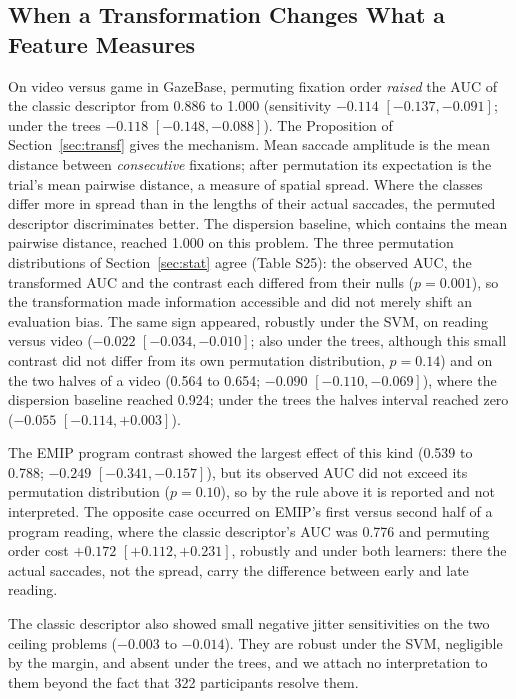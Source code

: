 \subsection{When a Transformation Changes What a Feature Measures}\label{sec:against}
On video versus game in GazeBase, permuting fixation order \emph{raised} the AUC of the classic descriptor from 0.886 to 1.000 (sensitivity $-0.114$ $[-0.137, -0.091]$; under the trees $-0.118$ $[-0.148, -0.088]$). The Proposition of Section~\ref{sec:transf} gives the mechanism. Mean saccade amplitude is the mean distance between \emph{consecutive} fixations; after permutation its expectation is the trial's mean pairwise distance, a measure of spatial spread. Where the classes differ more in spread than in the lengths of their actual saccades, the permuted descriptor discriminates better. The dispersion baseline, which contains the mean pairwise distance, reached 1.000 on this problem. The three permutation distributions of Section~\ref{sec:stat} agree (Table S25): the observed AUC, the transformed AUC and the contrast each differed from their nulls ($p = 0.001$), so the transformation made information accessible and did not merely shift an evaluation bias. The same sign appeared, robustly under the SVM, on reading versus video ($-0.022$ $[-0.034, -0.010]$; also under the trees, although this small contrast did not differ from its own permutation distribution, $p = 0.14$) and on the two halves of a video (0.564 to 0.654; $-0.090$ $[-0.110, -0.069]$), where the dispersion baseline reached 0.924; under the trees the halves interval reached zero ($-0.055$ $[-0.114, +0.003]$).

The EMIP program contrast showed the largest effect of this kind (0.539 to 0.788; $-0.249$ $[-0.341, -0.157]$), but its observed AUC did not exceed its permutation distribution ($p = 0.10$), so by the rule above it is reported and not interpreted. The opposite case occurred on EMIP's first versus second half of a program reading, where the classic descriptor's AUC was 0.776 and permuting order cost $+0.172$ $[+0.112, +0.231]$, robustly and under both learners: there the actual saccades, not the spread, carry the difference between early and late reading.

The classic descriptor also showed small negative jitter sensitivities on the two ceiling problems ($-0.003$ to $-0.014$). They are robust under the SVM, negligible by the margin, and absent under the trees, and we attach no interpretation to them beyond the fact that 322 participants resolve them.

